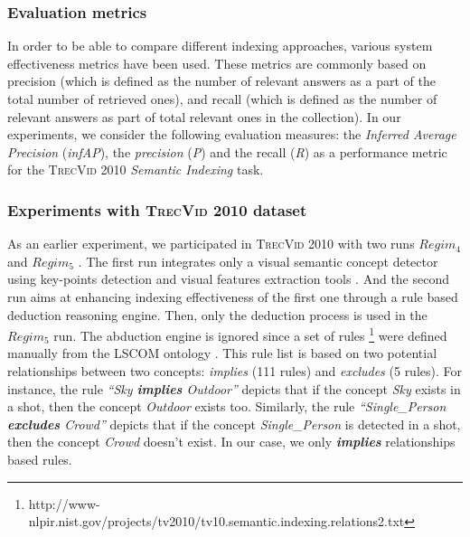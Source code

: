 		\subsubsection{Evaluation metrics}
		In order to be able to compare different indexing approaches, various system 
		effectiveness metrics have been used. These metrics are commonly based on precision
		(which is defined as the number of relevant answers as a part of the total number
		of retrieved ones), and recall (which is defined as the number of relevant answers
		as part of total relevant ones in the collection). In our experiments, we consider the following
		evaluation measures:  the \emph{Inferred Average Precision} (\textit{infAP}), the \emph{precision}
		(\textit{P}) and the recall (\textit{R}) as a
		performance metric for the \textsc{TrecVid 2010} \textit{Semantic Indexing} task.

		\subsubsection{Experiments with \textsc{TrecVid 2010} dataset}
		As an earlier experiment, we participated in \textsc{TrecVid 2010} 
		with two runs \textbf{\textit{$Regim_{4}$}} and  \textbf{\textit{$Regim_{5}$}} \citep{Elleuch2010}. 
		The first run integrates only a visual semantic concept detector using key-points detection 
		and visual features extraction tools \citep{Elleuch2010b}. And the second run aims at enhancing indexing 
		effectiveness of the first one through a rule based deduction reasoning engine.  
		Then, only the deduction process is used in the  \textbf{\textit{$Regim_{5}$}} run. 
		The abduction engine is ignored since a set of rules 
		\footnote{http://www-nlpir.nist.gov/projects/tv2010/tv10.semantic.indexing.relations2.txt} 
		were defined manually from the LSCOM ontology \citep{Kennedy2006}. 
		This rule list is based on two potential relationships between two concepts: 
		\emph{implies} (111 rules) and \emph{excludes} (5 rules). 
		For instance, the rule \textit{``Sky \textbf{implies} Outdoor''} depicts that if the concept 
		\textit{Sky} exists in a shot, then the concept \textit{Outdoor} exists too. 
		Similarly, the rule \textit{``Single\_Person \textbf{excludes} Crowd''} depicts that if the concept 
		\textit{Single\_Person} is detected in a shot, then the concept \textit{Crowd} doesn't exist.
		In our case, we  only \textit{\textbf{implies}} relationships based rules.

